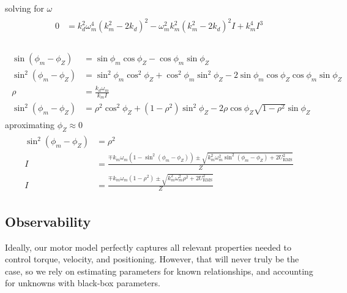 \documentclass[12pt,a4paper,oneside,openany]{article}
\begin{document}
solving for $\omega$
\begin{gather}
\begin{aligned}
0 &= k_d^2 \omega_m^4  \left(k_m^2 - 2 k_d \right)^2   - \omega_m^2 k_m^2 \left(k_m^2 - 2 k_d \right)^2 I + k_m^4 I^3 \\
\end{aligned}
\end{gather}



\begin{gather}
\begin{aligned}
\sin \left( \phi_m - \phi_Z \right)&= \sin \phi_m \cos \phi_Z - \cos \phi_m \sin \phi_Z \\
\sin^2 \left( \phi_m - \phi_Z \right)&= \sin^2 \phi_m \cos^2 \phi_Z + \cos^2 \phi_m \sin^2 \phi_Z - 2 \sin \phi_m \cos \phi_Z \cos \phi_m \sin \phi_Z\\
\rho &= \frac{k_d \omega_m}{k_m I} \\
\sin^2 \left( \phi_m - \phi_Z \right)&= \rho^2 \cos^2 \phi_Z + \left( 1-\rho^2 \right) \sin^2 \phi_Z - 2 \rho \cos \phi_Z \sqrt{1-\rho^2} \sin \phi_Z
\end{aligned}
\end{gather}
aproximating $\phi_Z \approx 0$
\begin{gather}
\begin{aligned}
\sin^2 \left( \phi_m - \phi_Z \right)&= \rho^2 \\
 I &= \frac{\mp k_m \omega_m \left(1 - \sin^2 \left( \phi_m - \phi_Z \right) \right) \pm \sqrt{k^2_m \omega^2_m \sin^2 \left( \phi_m - \phi_Z \right) + 2 U^2_{\textrm{RMS}} }}{Z} \\
 I &= \frac{\mp k_m \omega_m \left(1 - \rho^2 \right) \pm \sqrt{k^2_m \omega^2_m \rho^2 + 2 U^2_{\textrm{RMS}} }}{Z}
\end{aligned}
\end{gather}

\subsection{Observability}

Ideally, our motor model perfectly captures all relevant properties needed to control torque, velocity, and positioning. However, that will never truly be the case, so we rely on estimating parameters for known relationships, and accounting for unknowns with black-box parameters.
\end{document}
